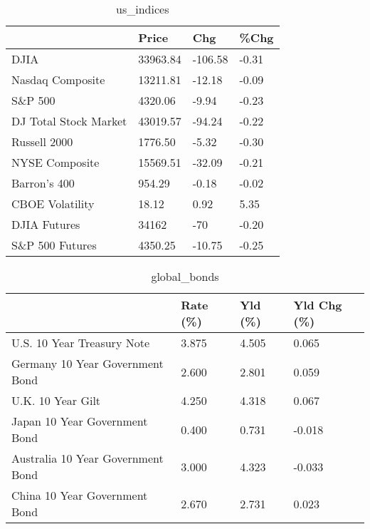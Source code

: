 \documentclass{article}%
\begin{document}
%


\begin{table}[htbp]%
\caption{us\_indices}%
\centering%
\begin{adjustbox}{width=1\textwidth}%
\begin{tabular}{llll}
\toprule
                      &    Price &     Chg &  \%Chg \\
\midrule
                 DJIA & 33963.84 & -106.58 & -0.31 \\
     Nasdaq Composite & 13211.81 &  -12.18 & -0.09 \\
              S\&P 500 &  4320.06 &   -9.94 & -0.23 \\
DJ Total Stock Market & 43019.57 &  -94.24 & -0.22 \\
         Russell 2000 &  1776.50 &   -5.32 & -0.30 \\
       NYSE Composite & 15569.51 &  -32.09 & -0.21 \\
         Barron's 400 &   954.29 &   -0.18 & -0.02 \\
      CBOE Volatility &    18.12 &    0.92 &  5.35 \\
         DJIA Futures &    34162 &     -70 & -0.20 \\
      S\&P 500 Futures &  4350.25 &  -10.75 & -0.25 \\
\bottomrule
\end{tabular}
%
\end{adjustbox}%
\end{table}

%


\begin{table}[htbp]%
\caption{global\_bonds}%
\centering%
\begin{adjustbox}{width=1\textwidth}%
\begin{tabular}{llll}
\toprule
                                  & Rate (\%) & Yld (\%) & Yld Chg (\%) \\
\midrule
       U.S. 10 Year Treasury Note &    3.875 &   4.505 &       0.065 \\
  Germany 10 Year Government Bond &    2.600 &   2.801 &       0.059 \\
                U.K. 10 Year Gilt &    4.250 &   4.318 &       0.067 \\
    Japan 10 Year Government Bond &    0.400 &   0.731 &      -0.018 \\
Australia 10 Year Government Bond &    3.000 &   4.323 &      -0.033 \\
    China 10 Year Government Bond &    2.670 &   2.731 &       0.023 \\
\bottomrule
\end{tabular}
%
\end{adjustbox}%
\end{table}
\end{document}
